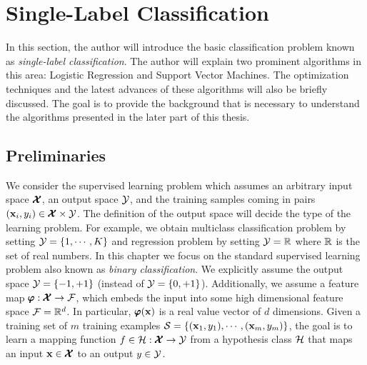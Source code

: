%
\section{Single-Label Classification}\label{sc_slc}

In this section, the author will introduce the basic classification problem known as \textit{single-label classification}.
The author will explain two prominent algorithms in this area: Logistic Regression and Support Vector Machines.
The optimization techniques and the latest advances of these algorithms will also be briefly discussed.
The goal is to provide the background that is necessary to understand the algorithms presented in the later part of this thesis. 

%
%
\subsection{Preliminaries}\label{sc_slc_pn}
We consider the supervised learning problem which assumes an arbitrary input space $\pmb {\mathcal{X}}$, an output space $\mathcal{Y}$, and the training samples coming in pairs $(\mathbf {x}_i,y_i)\in\pmb {\mathcal{X}}\times\mathcal{Y}$.
The definition of the output space will decide the type of the learning problem.
For example, we obtain multiclass classification problem by setting $\mathcal{Y}=\{1,\cdots,K\}$ and regression problem by setting $\mathcal{Y}=\mathbb{R}$ where $\mathbb{R}$ is the set of real numbers.
In this chapter we focus on the standard supervised learning problem also known as \textit{binary classification}.
We explicitly assume the output space $\mathcal{Y}=\{-1,+1\}$ (instead of $\mathcal{Y}=\{0,+1\}$).
Additionally, we assume a feature map $\pmb \varphi:\pmb {\mathcal{X}}\rightarrow\mathcal{F}$, which embeds the input into some high dimensional feature space $\mathcal{F}=\mathbb{R}^d$.
In particular, $\pmb \varphi(\mathbf {x})$ is a real value vector of $d$ dimensions.
Given a training set of $m$ training examples $\mathcal{S}=\{(\mathbf {x}_1,y_1),\cdots,(\mathbf {x}_m,y_m)\}$, the goal is to learn a mapping function $f\in\mathcal{H}:\pmb {\mathcal{X}}\rightarrow\mathcal{Y}$ from a {hypothesis class} $\mathcal{H}$ that maps an input $\mathbf {x}\in\pmb {\mathcal{X}}$ to an output $y\in\mathcal{Y}$. 

